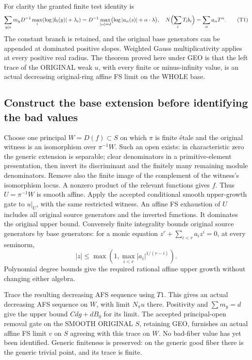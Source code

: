 \documentclass[
  10pt,
]{article}
\begin{document}
For clarity the granted finite test identity is \[
 \sum_{y\mid s}m_y D^{-1}\max_i(\log|b_i(y)|+\lambda_i)
 =D^{-1}\max_{|\alpha|=d}\bigl(\log|a_\alpha(s)|+\alpha\cdot\lambda\bigr),
 \quad N\Bigl(\sum_iT_i b_i\Bigr)=\sum_\alpha a_\alpha T^\alpha.
 \tag{T1}
\] The constant branch is retained, and the original base generators can
be appended at dominated positive slopes. Weighted Gauss
multiplicativity applies at every positive real radius. The theorem
proved here under GEO is that the left trace of the ORIGINAL weak \(u\),
with every finite or minus-infinity value, is an actual decreasing
original-ring affine FS limit on the WHOLE base.

\subsection{Construct the base extension before identifying the bad
values}\label{construct-the-base-extension-before-identifying-the-bad-values}

Choose one principal \(W=D(f)\subset S\) on which \(\pi\) is finite
étale and the original witness is an isomorphism over \(\pi^{-1}W\).
Such an open exists: in characteristic zero the generic extension is
separable; clear denominators in a primitive-element presentation, then
invert its discriminant and the finitely many remaining module
denominators. Remove also the finite image of the complement of the
witness's isomorphism locus. A nonzero product of the relevant functions
gives \(f\). Thus \(U=\pi^{-1}W\) is smooth affine. Apply the accepted
conditional smooth upper-growth gate to \(u|_U\), with the same
restricted witness. An affine FS exhaustion of \(U\) includes all
original source generators and the inverted functions. It dominates the
original upper bound. Conversely finite integrality bounds original
source generators by base generators: for a monic equation
\(z^r+\sum_{i<r}a_i z^i=0\), at every seminorm, \[
 |z|\le\max(1,\max_{i<r}|a_i|^{1/(r-i)}).
\] Polynomial degree bounds give the required rational affine upper
growth without changing either algebra.

Trace the resulting decreasing AFS sequence using \(T1\). This gives an
actual decreasing AFS sequence on \(W\), with limit \(N_\pi u\) there.
Positivity and \(\sum m_y=d\) give the upper bound \(Cd g+dB_0\) for its
limit. The accepted principal-open removal gate on the SMOOTH ORIGINAL
\(S\), retaining GEO, furnishes an actual affine FS limit \(v\) on \(S\)
agreeing with this trace on \(W\). No bad-fiber value has yet been
identified. Generic finiteness is preserved: on the generic good fiber
there is the generic trivial point, and its trace is finite.
\end{document}
